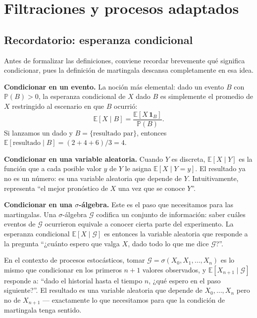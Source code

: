 \documentclass[12pt]{book}
\begin{document}
\section{Filtraciones y procesos adaptados}

\subsection*{Recordatorio: esperanza condicional}

Antes de formalizar las definiciones, conviene recordar brevemente qué significa condicionar, pues la definición de martingala descansa completamente en esa idea.

\textbf{Condicionar en un evento.} La noción más elemental: dado un evento $B$ con $\mathbb{P}(B) > 0$, la esperanza condicional de $X$ dado $B$ es simplemente el promedio de $X$ restringido al escenario en que $B$ ocurrió:
\[
    \mathbb{E}[X \mid B] = \frac{\mathbb{E}[X\,\mathbf{1}_B]}{\mathbb{P}(B)}.
\]
Si lanzamos un dado y $B = \{\text{resultado par}\}$, entonces $\mathbb{E}[\text{resultado} \mid B] = (2+4+6)/3 = 4$.

\textbf{Condicionar en una variable aleatoria.} Cuando $Y$ es discreta, $\mathbb{E}[X \mid Y]$ es la función que a cada posible valor $y$ de $Y$ le asigna $\mathbb{E}[X \mid Y = y]$. El resultado ya no es un número: es una variable aleatoria que depende de $Y$. Intuitivamente, representa ``el mejor pronóstico de $X$ una vez que se conoce $Y$''.

\textbf{Condicionar en una $\sigma$-álgebra.} Este es el paso que necesitamos para las martingalas. Una $\sigma$-álgebra $\mathcal{G}$ codifica un conjunto de información: saber cuáles eventos de $\mathcal{G}$ ocurrieron equivale a conocer cierta parte del experimento. La esperanza condicional $\mathbb{E}[X \mid \mathcal{G}]$ es entonces la variable aleatoria que responde a la pregunta ``¿cuánto espero que valga $X$, dado todo lo que me dice $\mathcal{G}$?''.

En el contexto de procesos estocásticos, tomar $\mathcal{G} = \sigma(X_0, X_1, \ldots, X_n)$ es lo mismo que condicionar en los primeros $n+1$ valores observados, y $\mathbb{E}[X_{n+1} \mid \mathcal{G}]$ responde a: ``dado el historial hasta el tiempo $n$, ¿qué espero en el paso siguiente?''. El resultado es una variable aleatoria que depende de $X_0, \ldots, X_n$ pero no de $X_{n+1}$ — exactamente lo que necesitamos para que la condición de martingala tenga sentido.
\end{document}

